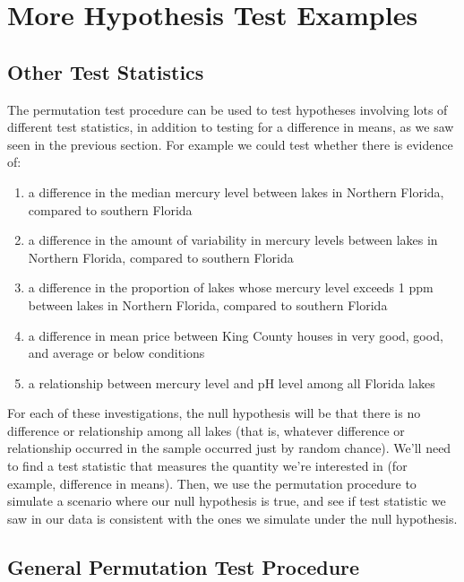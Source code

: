 \documentclass[
  letterpaper,
  DIV=11,
  numbers=noendperiod]{scrreprt}
\begin{document}
\section{More Hypothesis Test
Examples}\label{more-hypothesis-test-examples}

\subsection{Other Test Statistics}\label{other-test-statistics}

The permutation test procedure can be used to test hypotheses involving
lots of different test statistics, in addition to testing for a
difference in means, as we saw seen in the previous section. For example
we could test whether there is evidence of:

\begin{enumerate}
\def\labelenumi{\arabic{enumi}.}
\item
  a difference in the median mercury level between lakes in Northern
  Florida, compared to southern Florida
\item
  a difference in the amount of variability in mercury levels between
  lakes in Northern Florida, compared to southern Florida\\
\item
  a difference in the proportion of lakes whose mercury level exceeds 1
  ppm between lakes in Northern Florida, compared to southern Florida\\
\item
  a difference in mean price between King County houses in very good,
  good, and average or below conditions
\item
  a relationship between mercury level and pH level among all Florida
  lakes
\end{enumerate}

For each of these investigations, the null hypothesis will be that there
is no difference or relationship among all lakes (that is, whatever
difference or relationship occurred in the sample occurred just by
random chance). We'll need to find a test statistic that measures the
quantity we're interested in (for example, difference in means). Then,
we use the permutation procedure to simulate a scenario where our null
hypothesis is true, and see if test statistic we saw in our data is
consistent with the ones we simulate under the null hypothesis.

\subsection{General Permutation Test
Procedure}\label{general-permutation-test-procedure}
\end{document}
